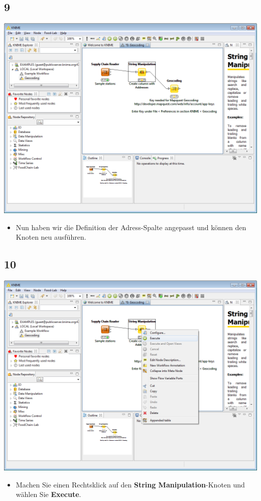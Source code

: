 \documentclass{beamer}
\begin{document}
\subsection{9}
\begin{frame}
	\begin{center}
  		\includegraphics[height=0.6\textheight]{9.png}
	\end{center}
	\begin{itemize}
		\item Nun haben wir die Definition der Adress-Spalte angepasst und können den Knoten neu ausführen.
	\end{itemize}
\end{frame}

\subsection{10}
\begin{frame}
	\begin{center}
  		\includegraphics[height=0.6\textheight]{10.png}
	\end{center}
	\begin{itemize}
		\item Machen Sie einen Rechtsklick auf den \textbf{String Manipulation}-Knoten und wählen Sie \textbf{Execute}.
	\end{itemize}
\end{frame}
\end{document}
